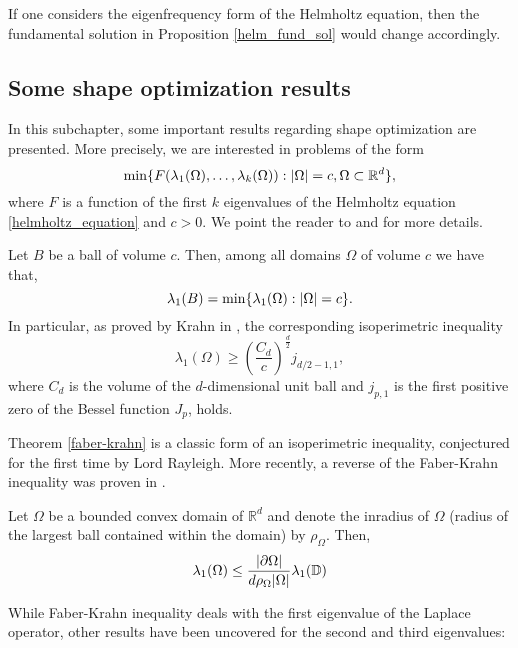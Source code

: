 If one considers the eigenfrequency form of the Helmholtz equation, then the fundamental solution in Proposition \ref{helm_fund_sol} would change accordingly.

\subsection{Some shape optimization results}

In this subchapter, some important results regarding shape optimization are presented. More precisely, we are interested in problems of the form
\begin{equation}\label{shape_prob}
    \min\{F(\lambda_1(\Omega),\dots, \lambda_k(\Omega)): \abs{\Omega} = c, \Omega \subset \mathbb{R}^d\},
\end{equation}
where \(F\) is a function of the first \(k\) eigenvalues of the Helmholtz equation \eqref{helmholtz_equation} and \(c > 0\). We point the reader to \cite{henrot2006extremum} and \cite{henrot2017shape} for more details.

\begin{theorem}\label{faber-krahn}
    Let \(B\) be a ball of volume \(c\). Then, among all domains \(\Omega\) of volume \(c\) we have that,
    \[
    \lambda_1(B) = \min\{\lambda_1(\Omega): \abs{\Omega} = c\}.
    \]
    In particular, as proved by Krahn in \cite{krahn1926minimaleigenschaften}, the corresponding isoperimetric inequality
    \[
        \lambda_1(\Omega) \geq \left(\frac{C_d}{c}\right)^\frac{d}{2}j_{d/2-1, 1},
    \]
    where \(C_d\) is the volume of the \(d\)-dimensional unit ball and \(j_{p,1}\) is the first positive zero of the Bessel function \(J_p\), holds.
\end{theorem}

Theorem \ref{faber-krahn} is a classic form of an isoperimetric inequality, conjectured for the first time by Lord Rayleigh. More recently, a reverse of the Faber-Krahn inequality was proven in \cite{freitas2008sharp}.
\begin{theorem}\label{reverse_faber-krahn}
    Let \(\Omega\) be a bounded convex domain of \(\mathbb{R}^d\) and denote the inradius of \(\Omega\) (radius of the largest ball contained within the domain) by \(\rho_\Omega\). Then,
    \[
    \lambda_1(\Omega) \leq \frac{\abs{\partial \Omega}}{d \rho_\Omega \abs{\Omega}} \lambda_1(\mathbb{D})
    \]
\end{theorem}   

While Faber-Krahn inequality deals with the first eigenvalue of the Laplace operator, other results have been uncovered for the second and third eigenvalues:

